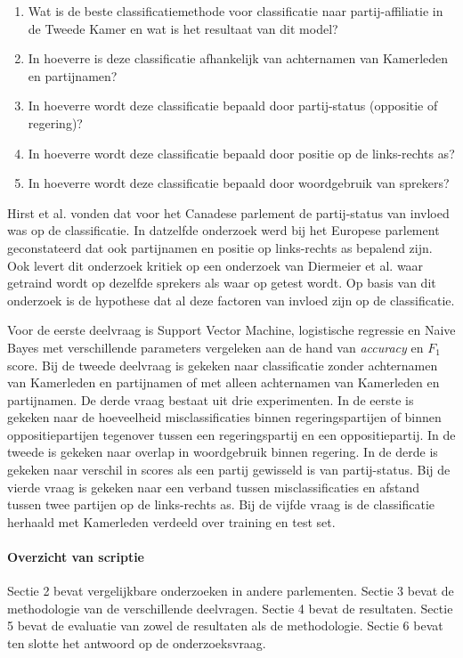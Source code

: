 \begin{enumerate}
    \item Wat is de beste classificatiemethode voor classificatie naar partij-affiliatie in de Tweede Kamer en wat is het resultaat van dit model?
    \item In hoeverre is deze classificatie afhankelijk van achternamen van Kamerleden en partijnamen?
    \item In hoeverre wordt deze classificatie bepaald door partij-status (oppositie of regering)?
    \item In hoeverre wordt deze classificatie bepaald door positie op de links-rechts as?
    \item In hoeverre wordt deze classificatie bepaald door woordgebruik van sprekers?
\end{enumerate}
Hirst et al. \cite{Hirst_textto} vonden dat voor het Canadese parlement de partij-status van invloed was op de classificatie. In datzelfde onderzoek werd bij het Europese parlement geconstateerd dat ook partijnamen en positie op links-rechts as bepalend zijn. Ook levert dit onderzoek kritiek op een onderzoek van Diermeier et al. \cite{diermeier_godbout_yu_kaufmann_2012} waar getraind wordt op dezelfde sprekers als waar op getest wordt. Op basis van dit onderzoek is de hypothese dat al deze factoren van invloed zijn op de classificatie.\par
Voor de eerste deelvraag is Support Vector Machine, logistische regressie en Naive Bayes met verschillende parameters vergeleken aan de hand van \textit{accuracy} en $F_1$ score. Bij de tweede deelvraag is gekeken naar classificatie zonder achternamen van Kamerleden en partijnamen of met alleen achternamen van Kamerleden en partijnamen. De derde vraag bestaat uit drie experimenten. In de eerste is gekeken naar de hoeveelheid misclassificaties binnen regeringspartijen of binnen oppositiepartijen tegenover tussen een regeringspartij en een oppositiepartij. In de tweede is gekeken naar overlap in woordgebruik binnen regering. In de derde is gekeken naar verschil in scores als een partij gewisseld is van partij-status. Bij de vierde vraag is gekeken naar een verband tussen misclassificaties en afstand tussen twee partijen op de links-rechts as. Bij de vijfde vraag is de classificatie herhaald met Kamerleden verdeeld over training en test set.


\paragraph{Overzicht van scriptie}
Sectie 2 bevat vergelijkbare onderzoeken in andere parlementen. Sectie 3 bevat de methodologie van de verschillende deelvragen. Sectie 4 bevat de resultaten. Sectie 5 bevat de evaluatie van zowel de resultaten als de methodologie. Sectie 6 bevat ten slotte het antwoord op de onderzoeksvraag.
